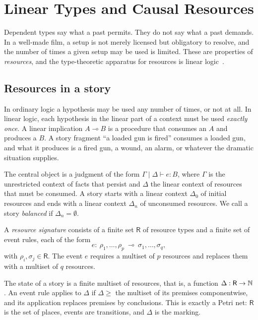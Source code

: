 \chapter{Linear Types and Causal Resources}
\label{ch:linear}

Dependent types say what a past permits. They do not say what a past demands. In a well-made film, a setup is not merely licensed but obligatory to resolve, and the number of times a given setup may be used is limited. These are properties of \emph{resources}, and the type-theoretic apparatus for resources is linear logic~\cite{girard1987}.

\section{Resources in a story}

In ordinary logic a hypothesis may be used any number of times, or not at all. In linear logic, each hypothesis in the linear part of a context must be used \emph{exactly once}. A linear implication $A\multimap B$ is a procedure that consumes an $A$ and produces a $B$. A story fragment ``a loaded gun is fired'' consumes a loaded gun, and what it produces is a fired gun, a wound, an alarm, or whatever the dramatic situation supplies.

The central object is a judgment of the form $\Gamma\mid\Delta\vdash e:B$, where $\Gamma$ is the unrestricted context of facts that persist and $\Delta$ the linear context of resources that must be consumed. A story starts with a linear context $\Delta_0$ of initial resources and ends with a linear context $\Delta_n$ of unconsumed resources. We call a story \emph{balanced} if $\Delta_n=\emptyset$.

\begin{definition}
A \emph{resource signature} consists of a finite set $\mathsf{R}$ of resource types and a finite set of event rules, each of the form
\[
e:\ \rho_1,\dots,\rho_p\ \multimap\ \sigma_1,\dots,\sigma_q,
\]
with $\rho_i,\sigma_j\in\mathsf{R}$. The event $e$ requires a multiset of $p$ resources and replaces them with a multiset of $q$ resources.
\end{definition}

The state of a story is a finite multiset of resources, that is, a function $\Delta:\mathsf{R}\to\mathbb{N}$. An event rule applies to $\Delta$ if $\Delta\ge$ the multiset of its premises componentwise, and its application replaces premises by conclusions. This is exactly a Petri net: $\mathsf{R}$ is the set of places, events are transitions, and $\Delta$ is the marking.

